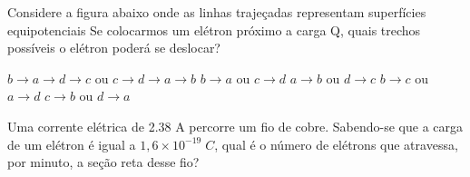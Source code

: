 \documentclass[12pt, addpoints]{exam}
\begin{document}
    \begin{questions}
\begin{multicols*}{2}
\question Considere a figura abaixo onde as linhas trajeçadas representam superfícies equipotenciais Se colocarmos um elétron próximo a carga Q, quais trechos possíveis o elétron poderá se deslocar?
        
        \begin{center}
            \begin{minipage}[c]{0.5\linewidth}
            \end{minipage}
        \end{center}
        
        

\begin{choices}
\choice $b\rightarrow a\rightarrow d\rightarrow c$ ou $c\rightarrow d\rightarrow a\rightarrow b$ 
\choice $b\rightarrow a$ ou $c\rightarrow d$ 
\choice $a\rightarrow b$ ou $d\rightarrow c$ 
\choice $b\rightarrow c$ ou $a\rightarrow d$ 
\choice $c\rightarrow b$ ou $d\rightarrow a$ 
\end{choices}
\question Uma corrente elétrica de    2.38 A percorre um ﬁo de cobre. Sabendo-se que a carga de um elétron é igual a $1,6\times 10^{-19}\;C$, qual é o número de elétrons que atravessa, por minuto, a seção reta desse ﬁo?


\end{multicols*}
\end{questions}
\end{document}
